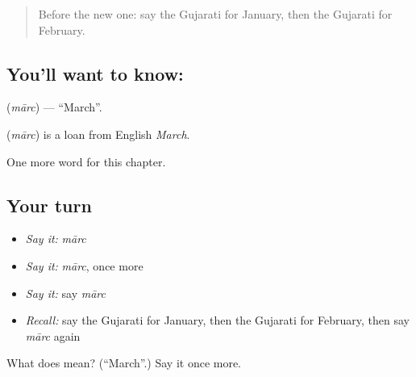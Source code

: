 \label{lesson:GU-C95-marc}



\begin{quote}
Before the new one: say the Gujarati for January, then the Gujarati for February.
\end{quote}

\subsection*{You'll want to know: }
\textbf{} (\emph{mārc}) — \textquotedblleft{}March\textquotedblright{}.

\begin{cousinweb}
\textbf{} (\emph{mārc}) is a loan from English \emph{March}.
\end{cousinweb}

\begin{grammarlens}[title={What you've built}]
One more word for this chapter.
\end{grammarlens}

\subsection*{Your turn}
\begin{itemize}
\raggedright
  \item \emph{Say it:} \emph{mārc}
  \item \emph{Say it:} \emph{mārc}, once more
  \item \emph{Say it:} say \emph{mārc}
  \item \emph{Recall:} say the Gujarati for January, then the Gujarati for February, then say \emph{mārc} again
\end{itemize}

\begin{tcolorbox}[breakable,colback=teal!4,colframe=teal!35!black,title={Before you move on}]
What does  mean? (\textquotedblleft{}March\textquotedblright{}.) Say it once more.
\end{tcolorbox}
